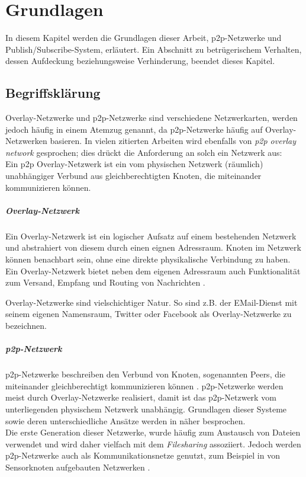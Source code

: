 \chapter{Grundlagen}
\label{chap:grundlagen}

In diesem Kapitel werden die Grundlagen dieser Arbeit, \ac{p2p}-Netzwerke und Publish/Subscribe-System, erläutert. Ein Abschnitt zu betrügerischem Verhalten, dessen Aufdeckung beziehungsweise Verhinderung, beendet dieses Kapitel.

\section{Begriffsklärung}

Overlay-Netzwerke und \ac{p2p}-Netzwerke sind verschiedene Netzwerkarten, werden jedoch häufig in einem Atemzug genannt, da p2p-Netzwerke häufig auf Overlay-Netzwerken basieren. In vielen zitierten Arbeiten wird ebenfalls von \emph{p2p overlay network} gesprochen; dies drückt die Anforderung an solch ein Netzwerk aus:\\
Ein p2p Overlay-Netzwerk ist ein vom physischen Netzwerk (räumlich) unabhängiger Verbund aus gleichberechtigten Knoten, die miteinander kommunizieren können.

\paragraph{Overlay-Netzwerk} Ein Overlay-Netzwerk ist ein logischer Aufsatz auf einem bestehenden Netzwerk und abstrahiert von diesem durch einen eignen Adressraum. Knoten im Netzwerk können benachbart sein, ohne eine direkte physikalische Verbindung zu haben.\\
Ein Overlay-Netzwerk bietet neben dem eigenen Adressraum auch Funktionalität zum Versand, Empfang und Routing von Nachrichten \cite{Tannenbaum2003}.

Overlay-Netzwerke sind vielschichtiger Natur. So sind z.B. der EMail-Dienst mit seinem eigenen Namensraum, Twitter oder Facebook als Overlay-Netzwerke zu bezeichnen.

\paragraph{\ac{p2p}-Netzwerk} p2p-Netzwerke beschreiben den Verbund von Knoten, sogenannten Peers, die miteinander gleichberechtigt kommunizieren können \cite{Steinmetz2005}. p2p-Netzwerke werden meist durch Overlay-Netzwerke realisiert, damit ist das p2p-Netzwerk vom unterliegenden physischem Netzwerk unabhängig. Grundlagen dieser Systeme sowie deren unterschiedliche Ansätze werden in  näher besprochen.\\
Die erste Generation dieser Netzwerke, wurde häufig zum Austausch von Dateien verwendet und wird daher vielfach mit dem \emph{Filesharing} assoziiert. Jedoch werden p2p-Netzwerke auch als Kommunikationsnetze genutzt, zum Beispiel in von Sensorknoten aufgebauten Netzwerken \cite{MuneebAliandKoenLangendoen2007Case, Darlagiannis2006Peertopeer}.











